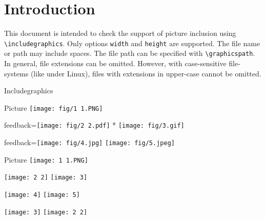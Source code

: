 \documentclass{article}
\begin{document}
\section*{Introduction}

This document is intended to check the support of picture inclusion using 
\verb|\includegraphics|. Only options \texttt{width} and \texttt{height} are 
supported. The file name or path may include spaces. The file path can be 
specified with \verb|\graphicspath|. In general, file extensions can be 
omitted. However, with case-sensitive file-systems (like under Linux), files 
with extensions in upper-case cannot be omitted.

\begin{quiz}{Includegraphics}

\begin{multi}{Picture}
\texttt{[image: fig/1 1.PNG]}
\item[feedback={\texttt{[image: fig/2 2.pdf]}}]* \texttt{[image: fig/3.gif]}
\item[feedback={\texttt{[image: fig/4.jpg]}}] \texttt{[image: fig/5.jpeg]}
\end{multi}

\graphicspath{{./fig/}}

\begin{matching}[dd]{Picture}
\texttt{[image: 1 1.PNG]}
\item \texttt{[image: 2 2]} \answer \texttt{[image: 3]}
\item \texttt{[image: 4]} \answer \texttt{[image: 5]}
\item \texttt{[image: 3]} \answer \texttt{[image: 2 2]}
\end{matching}

\end{quiz}
\end{document}
